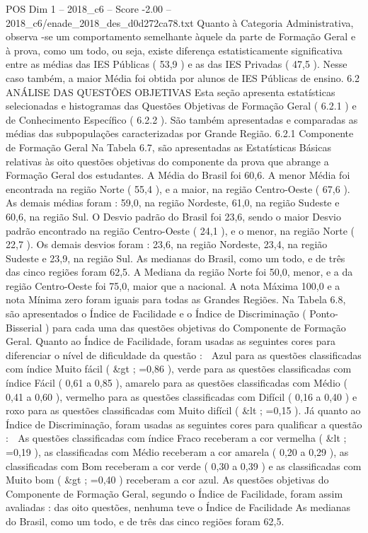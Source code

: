 \begin{textsample}{POS Dim 1 – 2018\_c6 – Score -2.00 – 2018\_c6/enade\_2018\_des\_d0d272ca78.txt}
Quanto à Categoria Administrativa, observa -se um comportamento semelhante àquele da parte de Formação Geral e à prova, como um todo, ou seja, existe diferença estatisticamente significativa entre as médias das IES Públicas ( 53,9 ) e as das IES Privadas ( 47,5 ).
Nesse caso também, a maior Média foi obtida por alunos de IES Públicas de ensino. 6.2 ANÁLISE DAS QUESTÕES OBJETIVAS Esta seção apresenta estatísticas selecionadas e histogramas das Questões Objetivas de Formação Geral ( 6.2.1 ) e de Conhecimento Específico ( 6.2.2 ).
São também apresentadas e comparadas as médias das subpopulações caracterizadas por Grande Região. 6.2.1 Componente de Formação Geral Na Tabela 6.7, são apresentadas as Estatísticas Básicas relativas às oito questões objetivas do componente da prova que abrange a Formação Geral dos estudantes.
A Média do Brasil foi 60,6.
A menor Média foi encontrada na região Norte ( 55,4 ), e a maior, na região Centro-Oeste ( 67,6 ).
As demais médias foram : 59,0, na região Nordeste, 61,0, na região Sudeste e 60,6, na região Sul.
O Desvio padrão do Brasil foi 23,6, sendo o maior Desvio padrão encontrado na região Centro-Oeste ( 24,1 ), e o menor, na região Norte ( 22,7 ).
Os demais desvios foram : 23,6, na região Nordeste, 23,4, na região Sudeste e 23,9, na região Sul.
As medianas do Brasil, como um todo, e de três das cinco regiões foram 62,5.
A Mediana da região Norte foi 50,0, menor, e a da região Centro-Oeste foi 75,0, maior que a nacional.
A nota Máxima 100,0 e a nota Mínima zero foram iguais para todas as Grandes Regiões.
Na Tabela 6.8, são apresentados o Índice de Facilidade e o Índice de Discriminação ( Ponto-Bisserial ) para cada uma das questões objetivas do Componente de Formação Geral.
Quanto ao Índice de Facilidade, foram usadas as seguintes cores para diferenciar o nível de dificuldade da questão :  Azul para as questões classificadas com índice Muito fácil ( \&gt ; =0,86 ), verde para as questões classificadas com índice Fácil ( 0,61 a 0,85 ), amarelo para as questões classificadas com Médio ( 0,41 a 0,60 ), vermelho para as questões classificadas com Difícil ( 0,16 a 0,40 ) e roxo para as questões classificadas com Muito difícil ( \&lt ; =0,15 ).
Já quanto ao Índice de Discriminação, foram usadas as seguintes cores para qualificar a questão :  As questões classificadas com índice Fraco receberam a cor vermelha ( \&lt ; =0,19 ), as classificadas com Médio receberam a cor amarela ( 0,20 a 0,29 ), as classificadas com Bom receberam a cor verde ( 0,30 a 0,39 ) e as classificadas com Muito bom ( \&gt ; =0,40 ) receberam a cor azul.
As questões objetivas do Componente de Formação Geral, segundo o Índice de Facilidade, foram assim avaliadas : das oito questões, nenhuma teve o Índice de Facilidade As medianas do Brasil, como um todo, e de três das cinco regiões foram 62,5.

\end{textsample}
